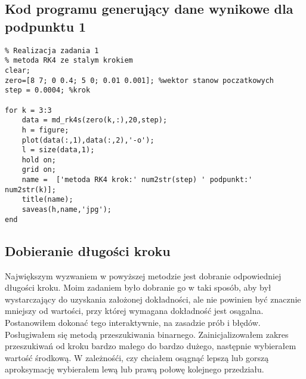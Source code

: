 \documentclass[a4paper, 11pt]{article}
\begin{document}
\subsection{Kod programu generujący dane wynikowe dla podpunktu 1}
\begin{lstlisting}
% Realizacja zadania 1 
% metoda RK4 ze stalym krokiem
clear; 
zero=[8 7; 0 0.4; 5 0; 0.01 0.001]; %wektor stanow poczatkowych
step = 0.0004; %krok

for k = 3:3
    data = md_rk4s(zero(k,:),20,step);
    h = figure;
    plot(data(:,1),data(:,2),'-o');
    l = size(data,1);
    hold on;
    grid on;
    name =  ['metoda RK4 krok:' num2str(step) ' podpunkt:' num2str(k)]; 
    title(name);
    saveas(h,name,'jpg');
end
\end{lstlisting}

\subsection{Dobieranie długości kroku}
Największym wyzwaniem w powyższej metodzie jest dobranie odpowiedniej długości kroku. Moim zadaniem było dobranie go w taki sposób, aby był wystarczający do uzyskania założonej dokładności, ale nie powinien być znacznie mniejszy od wartości, przy której wymagana dokładność jest osągalna. \\
Postanowiłem dokonać tego interaktywnie, na zasadzie prób i błędów. Posługiwałem się metodą przeszukiwania binarnego. Zainicjalizowałem zakres przeszukiwań od kroku bardzo małego do bardzo dużego, następnie wybierałem wartość środkową. W zależnośći, czy chciałem osągnąć lepszą lub gorszą aproksymację wybierałem lewą lub prawą połowę kolejnego przedziału.
\end{document}
